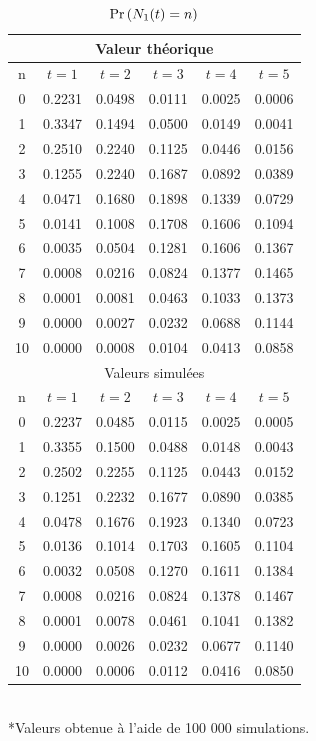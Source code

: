 \documentclass[12pt, french]{report}
\begin{document}
\begin{table}[!ht]
    \centering
    \caption{$\Pr \left( N_1(t)=n \right)$}
    \label{TB:Prob processus 1}
    \begin{tabular}{|cccccc|}
        \hline
        \multicolumn{6}{|c|}{Valeur théorique} \\
        \hline
        n & $t=1$ & $t=2$ & $t=3$ & $t=4$ & $t=5$ \\ 
        \hline
        0 & 0.2231 & 0.0498 & 0.0111 & 0.0025 & 0.0006 \\ 
        1 & 0.3347 & 0.1494 & 0.0500 & 0.0149 & 0.0041 \\ 
        2 & 0.2510 & 0.2240 & 0.1125 & 0.0446 & 0.0156 \\ 
        3 & 0.1255 & 0.2240 & 0.1687 & 0.0892 & 0.0389 \\ 
        4 & 0.0471 & 0.1680 & 0.1898 & 0.1339 & 0.0729 \\ 
        5 & 0.0141 & 0.1008 & 0.1708 & 0.1606 & 0.1094 \\ 
        6 & 0.0035 & 0.0504 & 0.1281 & 0.1606 & 0.1367 \\ 
        7 & 0.0008 & 0.0216 & 0.0824 & 0.1377 & 0.1465 \\ 
        8 & 0.0001 & 0.0081 & 0.0463 & 0.1033 & 0.1373 \\ 
        9 & 0.0000 & 0.0027 & 0.0232 & 0.0688 & 0.1144 \\ 
        10 & 0.0000 & 0.0008 & 0.0104 & 0.0413 & 0.0858 \\ 
        \hline
        \hline
        \multicolumn{6}{|c|}{Valeurs simulées} \\
        \hline
        n & $t=1$ & $t=2$ & $t=3$ & $t=4$ & $t=5$ \\ 
        \hline
        0  & 0.2237 & 0.0485 & 0.0115 & 0.0025 & 0.0005 \\ 
        1  & 0.3355 & 0.1500 & 0.0488 & 0.0148 & 0.0043 \\ 
        2  & 0.2502 & 0.2255 & 0.1125 & 0.0443 & 0.0152 \\ 
        3  & 0.1251 & 0.2232 & 0.1677 & 0.0890 & 0.0385 \\ 
        4  & 0.0478 & 0.1676 & 0.1923 & 0.1340 & 0.0723 \\ 
        5  & 0.0136 & 0.1014 & 0.1703 & 0.1605 & 0.1104 \\ 
        6  & 0.0032 & 0.0508 & 0.1270 & 0.1611 & 0.1384 \\ 
        7  & 0.0008 & 0.0216 & 0.0824 & 0.1378 & 0.1467 \\ 
        8  & 0.0001 & 0.0078 & 0.0461 & 0.1041 & 0.1382 \\ 
        9  & 0.0000 & 0.0026 & 0.0232 & 0.0677 & 0.1140 \\ 
        10 & 0.0000 & 0.0006 & 0.0112 & 0.0416 & 0.0850 \\ 
        \hline
    \end{tabular} \\
    *Valeurs obtenue à l'aide de 100 000 simulations.
\end{table}
\end{document}
